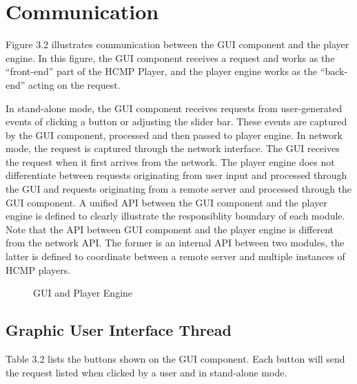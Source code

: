 \section{Communication}

Figure 3.2 illustrates communication between the GUI component and the player 
engine. In this figure, the GUI component receives a request and works as the 
``front-end'' part of the HCMP Player, and the player engine works as the 
``back-end'' acting on the request. 

In stand-alone mode, the GUI component 
receives requests from user-generated events of clicking a button or adjusting 
the slider bar. These events are captured by the GUI component, processed and 
then passed to player engine. In network mode, the request is captured through 
the network interface. The GUI receives the request when it first arrives 
from the network. The player engine does not differentiate between requests 
originating from user input and processed through the GUI and requests 
originating from a remote server and processed through the GUI component. 
A unified API between the GUI component and the player engine is defined to
clearly illustrate the responsiblity boundary of each module. Note that the 
API between GUI component and the player engine is different from the network API. 
The former is an internal API between two modules, the latter is defined to 
coordinate between a remote server and multiple instances of HCMP players.

\begin{figure}[H]
\caption{GUI and Player Engine}
\label{fig:speciation}
\end{figure}

\subsection{Graphic User Interface Thread}

Table 3.2 lists the buttons shown on the GUI component. Each button will send
the request listed when clicked by a user and in stand-alone mode.

